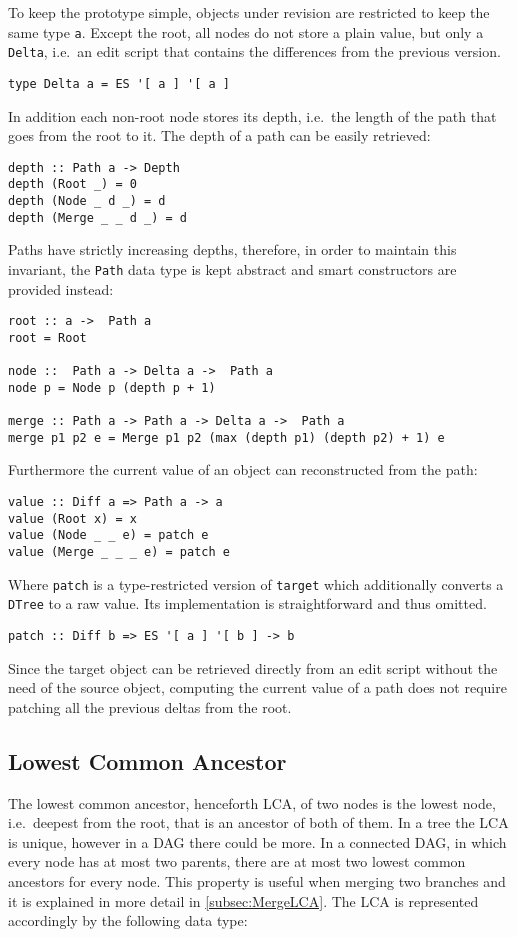 \documentclass[../Thesis.tex]{subfiles}
\begin{document}
	To keep the prototype simple, objects under revision are restricted to
	keep the same type \texttt{a}. Except the root, all nodes do
	not store a plain value, but only a \texttt{Delta}, i.e.\ an edit script 
	that contains the 	differences from the previous version.
\begin{verbatim}
type Delta a = ES '[ a ] '[ a ]
\end{verbatim}
	
	In addition each non-root node stores its depth, i.e.\ the length of the 
	path that goes from the root to it.
	The depth of a path can be easily retrieved:
\begin{verbatim}
depth :: Path a -> Depth
depth (Root _) = 0
depth (Node _ d _) = d
depth (Merge _ _ d _) = d
\end{verbatim}

	Paths have strictly increasing depths, therefore, in order to maintain this 
	invariant, the \texttt{Path} data type is kept abstract 
	and smart constructors are provided instead:

\begin{verbatim}
root :: a ->  Path a
root = Root

node ::  Path a -> Delta a ->  Path a
node p = Node p (depth p + 1)

merge :: Path a -> Path a -> Delta a ->  Path a
merge p1 p2 e = Merge p1 p2 (max (depth p1) (depth p2) + 1) e
\end{verbatim}
	
	Furthermore the current value of an object can reconstructed from the path:

\begin{verbatim}
value :: Diff a => Path a -> a
value (Root x) = x 
value (Node _ _ e) = patch e
value (Merge _ _ _ e) = patch e
\end{verbatim}

	Where \texttt{patch} is a type-restricted version of \texttt{target}
	which additionally converts a \texttt{DTree} to a raw value. Its
	implementation is straightforward and thus omitted.
\begin{verbatim}
patch :: Diff b => ES '[ a ] '[ b ] -> b
\end{verbatim}
	
	Since the target object can be retrieved directly from an edit script 
	without the need of the source object, computing the current
	value of a path does not require patching all the previous deltas 
	from the root.
	
	\subsection{Lowest Common Ancestor}
	The lowest common ancestor, henceforth LCA, of two nodes is the lowest
	node, i.e.\ deepest from the root, that is an ancestor of both of them.	
	In a tree the LCA is unique, however in a DAG there could be more.
	In a connected DAG, in which every node has at most two parents, there are at most
	two lowest common ancestors for every node.
	This property is useful when merging two branches and it is explained 
	in more detail in \ref{subsec:MergeLCA}.
	The LCA is represented accordingly by the following data type:
\end{document}
